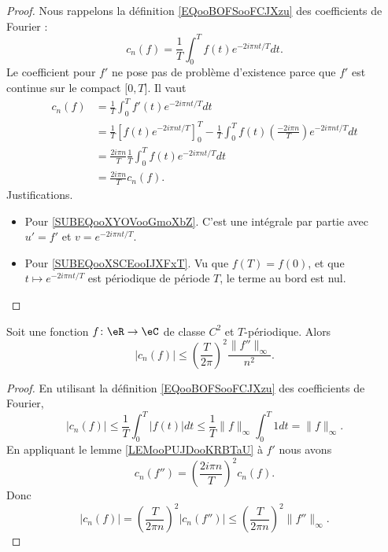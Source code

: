 \begin{proof}
    Nous rappelons la définition \eqref{EQooBOFSooFCJXzu} des coefficients de Fourier :
    \begin{equation}
        c_n(f)=\frac{1}{ T }\int_0^Tf(t) e^{-2 i \pi n t/T}dt.
    \end{equation}
    Le coefficient pour \( f'\) ne pose pas de problème d'existence parce que \( f'\) est continue sur le compact \( \mathopen[ 0 , T \mathclose]\). Il vaut
    \begin{subequations}
        \begin{align}
        c_n(f)&=\frac{1}{ T }\int_0^Tf'(t) e^{-2 i \pi n t/T}dt\\
        &=\frac{1}{ T }\left[ f(t) e^{-2i\pi nt/T} \right]_0^T-\frac{1}{ T }\int_0^Tf(t)\left( \frac{ -2i\pi n }{ T } \right) e^{-2i\pi nt/T}dt \label{SUBEQooXYOVooGmoXbZ}\\
        &=\frac{ 2i\pi n }{ T }\frac{1}{ T }\int_0^Tf(t) e^{-2i\pi nt/T}dt \label{SUBEQooXSCEooIJXFxT}\\
        &=\frac{ 2i\pi n }{ T }c_n(f).
        \end{align}
    \end{subequations}
    Justifications.
    \begin{itemize}
        \item Pour \eqref{SUBEQooXYOVooGmoXbZ}. C'est une intégrale par partie avec \( u'=f'\) et \( v= e^{-2i\pi nt/T}\).
        \item Pour \eqref{SUBEQooXSCEooIJXFxT}. Vu que \( f(T)=f(0)\), et que \( t\mapsto  e^{-2i\pi nt/T}\) est périodique de période \( T\), le terme au bord est nul.
    \end{itemize}
\end{proof}

\begin{lemma}     \label{LEMooYJQWooDVvSyj}
    Soit une fonction \( f\colon \eR\to \eC\) de classe \( C^2\) et \( T\)-périodique. Alors
    \begin{equation}
        | c_n(f) |\leq \left( \frac{ T }{ 2\pi } \right)^2 \frac{ \| f'' \|_{\infty} }{ n^2 }.
    \end{equation}
\end{lemma}

\begin{proof}
    En utilisant la définition \eqref{EQooBOFSooFCJXzu} des coefficients de Fourier,
    \begin{equation}
        | c_n(f) |\leq \frac{1}{ T }\int_0^T| f(t) |dt\leq \frac{ 1 }{ T }\| f \|_{\infty}\int_0^T1dt=\| f \|_{\infty}.
    \end{equation}
    En appliquant le lemme \ref{LEMooPUJDooKRBTaU} à \( f'\) nous avons
    \begin{equation}
        c_n(f'')=\left( \frac{ 2i\pi n }{ T } \right)^2c_n(f).
    \end{equation}
    Donc
    \begin{equation}
        | c_n(f) |=\left( \frac{ T }{ 2\pi n } \right)^2| c_n(f'') |\leq \left( \frac{ T }{ 2\pi n } \right)^2\| f'' \|_{\infty}.
    \end{equation}
\end{proof}


